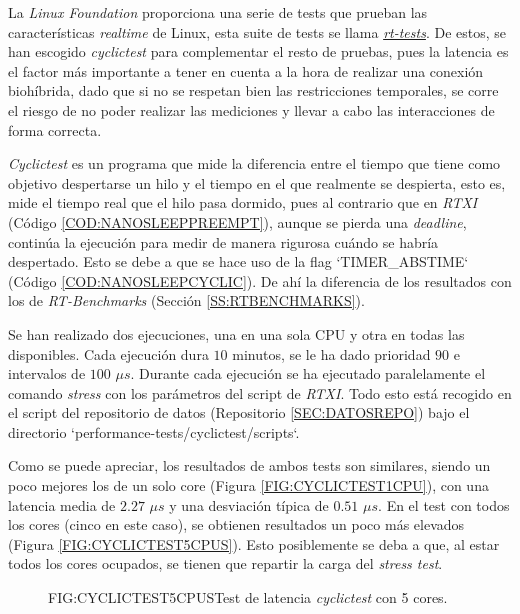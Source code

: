 La \textit{Linux Foundation} proporciona una serie de tests que prueban las características \textit{realtime} de Linux, esta suite de tests se llama \href{https://git.kernel.org/pub/scm/utils/rt-tests/rt-tests.git}{\textit{rt-tests}}. 
De estos, se han escogido \textit{cyclictest} para complementar el resto de pruebas, pues la latencia es el factor más importante a tener en cuenta a la hora de realizar una conexión biohíbrida, dado que si no se respetan bien las restricciones temporales, se corre el riesgo de no poder realizar las mediciones y llevar a cabo las interacciones de forma correcta.

\textit{Cyclictest} es un programa que mide la diferencia entre el tiempo que tiene como objetivo despertarse un hilo y el tiempo en el que realmente se despierta, esto es, mide el tiempo real que el hilo pasa dormido, pues al contrario que en \textit{RTXI} (Código \ref{COD:NANOSLEEPPREEMPT}), aunque se pierda una \textit{deadline}, continúa la ejecución para medir de manera rigurosa cuándo se habría despertado. Esto se debe a que se hace uso de la flag `TIMER\_ABSTIME` (Código \ref{COD:NANOSLEEPCYCLIC}). De ahí la diferencia de los resultados con los de \textit{RT-Benchmarks} (Sección \ref{SS:RTBENCHMARKS}).

Se han realizado dos ejecuciones, una en una sola CPU y otra en todas las disponibles. Cada ejecución dura $10$ minutos, se le ha dado prioridad $90$ e intervalos de $100$ $\mu s$. Durante cada ejecución se ha ejecutado paralelamente el comando \textit{stress} con los parámetros del script de \textit{RTXI}. Todo esto está recogido en el script del repositorio de datos (Repositorio \ref{SEC:DATOSREPO}) bajo el directorio `performance-tests/cyclictest/scripts`.

Como se puede apreciar, los resultados de ambos tests son similares, siendo un poco mejores los de un solo core (Figura \ref{FIG:CYCLICTEST1CPU}), con una latencia media de $2.27$ $\mu s$ y una desviación típica de $0.51$ $\mu s$. En el test con todos los cores (cinco en este caso), se obtienen resultados un poco más elevados (Figura \ref{FIG:CYCLICTEST5CPUS}). Esto posiblemente se deba a que, al estar todos los cores ocupados, se tienen que repartir la carga del \textit{stress test}. 

\begin{figure}[Ejecución de cylictest con 5 cores]{FIG:CYCLICTEST5CPUS}{Test de latencia \textit{cyclictest} con 5 cores.}
\end{figure}

